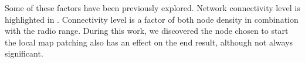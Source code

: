 Some of these factors have been previously explored.  Network connectivity level is highlighted in \cite{CCAMAP09}.  Connectivity level is a factor of both node density in combination with the radio range.  During this work, we discovered the node chosen to start the local map patching also has an effect on the end result, although not always significant.  
